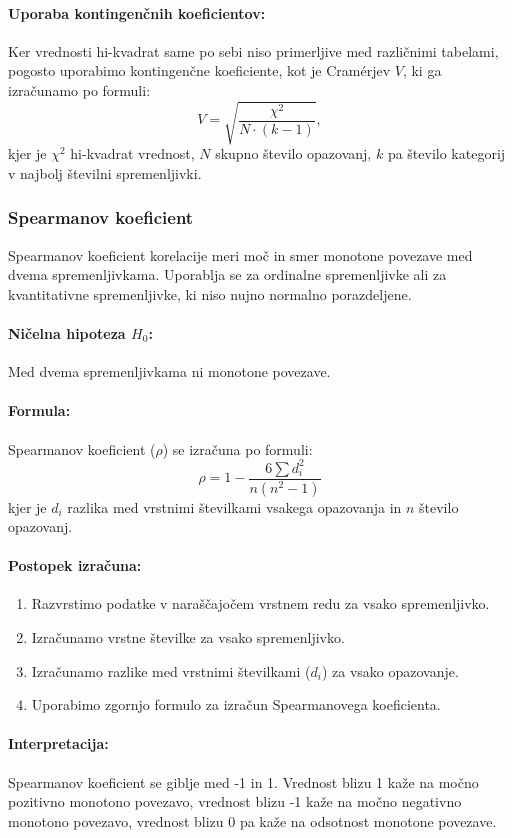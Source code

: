 \paragraph{Uporaba kontingenčnih koeficientov:}
Ker vrednosti hi-kvadrat same po sebi niso primerljive med različnimi tabelami, pogosto uporabimo kontingenčne koeficiente, kot je Cramérjev $V$, ki ga izračunamo po formuli:
\[V = \sqrt{\frac{\chi^2}{N \cdot (k - 1)}},\]
kjer je $\chi^2$ hi-kvadrat vrednost, $N$ skupno število opazovanj, $k$ pa število kategorij v najbolj številni spremenljivki.

\subsubsection*{Spearmanov koeficient}

Spearmanov koeficient korelacije meri moč in smer monotone povezave med dvema spremenljivkama. Uporablja se za ordinalne spremenljivke ali za kvantitativne spremenljivke, ki niso nujno normalno porazdeljene.

\paragraph{Ničelna hipoteza $H_0$:}
Med dvema spremenljivkama ni monotone povezave.

\paragraph{Formula:}
Spearmanov koeficient ($\rho$) se izračuna po formuli:
\[
\rho = 1 - \frac{6 \sum d_i^2}{n(n^2 - 1)}
\]
kjer je $d_i$ razlika med vrstnimi številkami vsakega opazovanja in $n$ število opazovanj.

\paragraph{Postopek izračuna:}
\begin{enumerate}
    \item Razvrstimo podatke v naraščajočem vrstnem redu za vsako spremenljivko.
    \item Izračunamo vrstne številke za vsako spremenljivko.
    \item Izračunamo razlike med vrstnimi številkami ($d_i$) za vsako opazovanje.
    \item Uporabimo zgornjo formulo za izračun Spearmanovega koeficienta.
\end{enumerate}

\paragraph{Interpretacija:}
Spearmanov koeficient se giblje med -1 in 1. Vrednost blizu 1 kaže na močno pozitivno monotono povezavo, vrednost blizu -1 kaže na močno negativno monotono povezavo, vrednost blizu 0 pa kaže na odsotnost monotone povezave.

